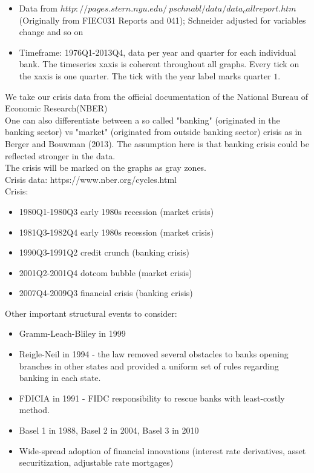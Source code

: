\documentclass[12pt, a4paper]{article} %
\begin{document}
\begin{itemize}
\item Data from  $http://pages.stern.nyu.edu/~pschnabl/data/data_callreport.htm$ (Originally from FIEC031 Reports and 041); Schneider adjusted for variables change and so on
\item Timeframe: 1976Q1-2013Q4, data per year and quarter for each individual bank. The timeseries xaxis is coherent throughout all graphs. Every tick on the xaxis is one quarter. The tick with the year label marks quarter $1$. 
\end{itemize}


We take our crisis data from the official documentation of the National Bureau of Economic Research(NBER) \\

One can also differentiate between a so called "banking" (originated in the banking sector) vs "market" (originated from outside banking sector) crisis as in Berger and Bouwman (2013).  The assumption here is that banking crisis could be reflected stronger in the data. \\
The crisis will be marked on the graphs as gray zones. \\
Crisis data: https://www.nber.org/cycles.html \\
Crisis:
\begin{itemize}
\item 1980Q1-1980Q3 early 1980s recession (market crisis)
\item 1981Q3-1982Q4 early 1980s recession (market crisis)
\item 1990Q3-1991Q2 credit crunch (banking crisis)
\item 2001Q2-2001Q4 dotcom bubble (market crisis)
\item 2007Q4-2009Q3 financial crisis (banking crisis)
\end{itemize}



Other important structural events to consider:
\begin{itemize}
\item Gramm-Leach-Bliley in 1999
\item Reigle-Neil in 1994 - the law removed several obstacles to banks opening branches in other states and provided a uniform set of rules regarding banking in each state.
\item FDICIA in 1991 - FIDC responsibility to rescue banks with least-costly method.
\item Basel 1 in 1988, Basel 2 in 2004, Basel 3 in 2010
\item Wide-spread adoption of financial innovations
(interest rate derivatives, asset securitization, adjustable rate mortgages)
\end{itemize}
\end{document}
